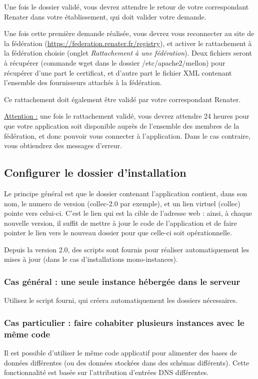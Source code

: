 Une fois le dossier validé, vous devrez attendre le retour de votre correspondant Renater dans votre établissement, qui doit valider votre demande.

Une fois cette première demande réalisée, vous devrez vous reconnecter au site de la fédération (\href{https://federation.renater.fr/registry}{https://federation.renater.fr/registry}), et activer le rattachement à la fédération choisie (onglet \textit{Rattachement à une fédération}). Deux fichiers seront à récupérer (commande wget dans le dossier /etc/apache2/mellon) pour récupérer d'une part le certificat, et d'autre part le fichier XML contenant l'ensemble des fournisseurs attachés à la fédération.

Ce rattachement doit également être validé par votre correspondant Renater.

\underline{Attention :} une fois le rattachement validé, vous devrez attendre 24 heures pour que votre application soit disponible auprès de l'ensemble des membres de la fédération, et donc pouvoir vous connecter à l'application. Dans le cas contraire, vous obtiendrez des messages d'erreur.
 

\subsection{Configurer le dossier d'installation}

Le principe général est que le dossier contenant l'application contient, dans son nom, le numero de version (collec-2.0 par exemple), et un lien virtuel (collec) pointe vers celui-ci. C'est le lien qui est la cible de l'adresse web : ainsi, à chaque nouvelle version, il suffit de mettre à jour le code de l'application et de faire pointer le lien vers le nouveau dossier pour que celle-ci soit opérationnelle.

Depuis la version 2.0, des scripts sont fournis pour réaliser automatiquement les mises à jour (dans le cas d'installations mono-instances).

\subsubsection{Cas général : une seule instance hébergée dans le serveur}

Utilisez le script fourni, qui créera automatiquement les dossiers nécessaires. 


\subsubsection{Cas particulier : faire cohabiter plusieurs instances avec le même code}
\label{dnsmultiple}
Il est possible d'utiliser le même code applicatif pour alimenter des bases de données différentes (ou des données stockées dans des schémas différents). Cette fonctionnalité est basée sur l'attribution d'entrées DNS différentes. 

